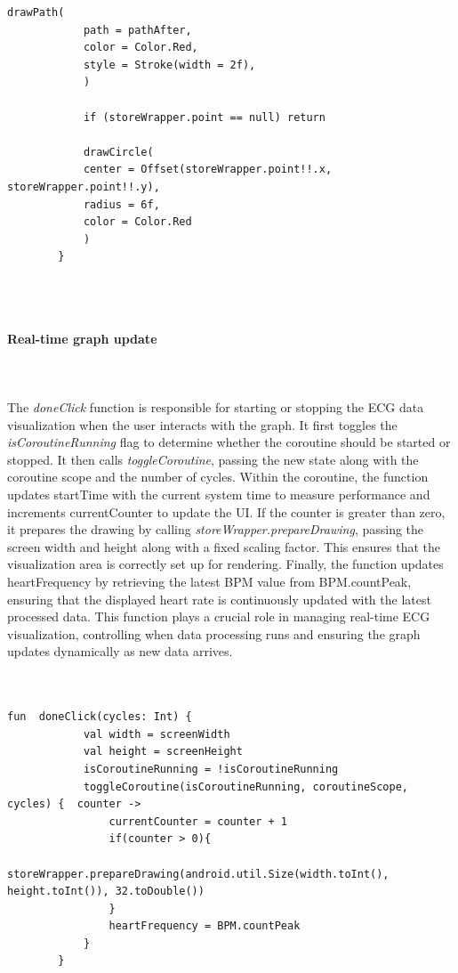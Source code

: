 {{\begin{lstlisting}[label={fig:simpleSourceGen.cs}, caption={Code to draw the prepared Overlaygraph}]
			drawPath(
			path = pathAfter,
			color = Color.Red,
			style = Stroke(width = 2f),
			)
			
			if (storeWrapper.point == null) return
			
			drawCircle(
			center = Offset(storeWrapper.point!!.x, storeWrapper.point!!.y),
			radius = 6f,
			color = Color.Red
			)
		}
	\end{lstlisting}
	\mbox{}\\
	\mbox{}\\
	\paragraph{Real-time graph update}\mbox{}\\
	\mbox{}\\
	The \textit{doneClick} function is responsible for starting or stopping the ECG data visualization when the user interacts with the graph. It first toggles the \textit{isCoroutineRunning} flag to determine whether the coroutine should be started or stopped. It then calls \textit{toggleCoroutine}, passing the new state along with the coroutine scope and the number of cycles. Within the coroutine, the function updates startTime with the current system time to measure performance and increments currentCounter to update the UI. If the counter is greater than zero, it prepares the drawing by calling \textit{storeWrapper.prepareDrawing}, passing the screen width and height along with a fixed scaling factor. This ensures that the visualization area is correctly set up for rendering. Finally, the function updates heartFrequency by retrieving the latest BPM value from BPM.countPeak, ensuring that the displayed heart rate is continuously updated with the latest processed data. This function plays a crucial role in managing real-time ECG visualization, controlling when data processing runs and ensuring the graph updates dynamically as new data arrives.
	\mbox{}\\
	\mbox{}\\
	\mbox{}\\
		\begin{lstlisting}[label={fig:simpleSourceGen.cs}, caption={Code to toggle drawing per user input}]
		 fun  doneClick(cycles: Int) {
			val width = screenWidth
			val height = screenHeight
			isCoroutineRunning = !isCoroutineRunning
			toggleCoroutine(isCoroutineRunning, coroutineScope, cycles) {  counter ->
				currentCounter = counter + 1
				if(counter > 0){
					storeWrapper.prepareDrawing(android.util.Size(width.toInt(), height.toInt()), 32.toDouble())
				}
				heartFrequency = BPM.countPeak
			}
		}
		

\end{lstlisting}}}
